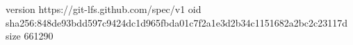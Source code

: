 version https://git-lfs.github.com/spec/v1
oid sha256:848de93bdd597c9424dc1d965fbda01c7f2a1e3d2b34c1151682a2bc2c23117d
size 661290
